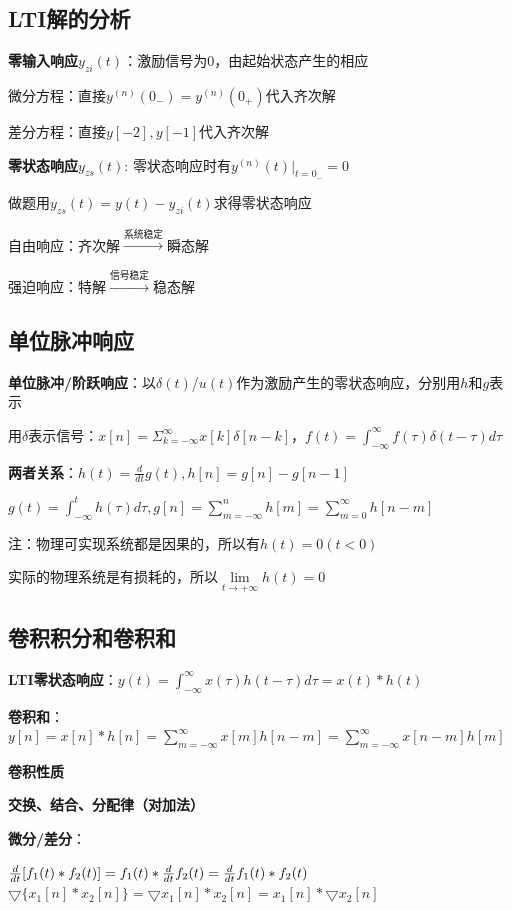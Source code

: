 \subsection*{LTI解的分析}

\textbf{零输入响应}$y_{zi}(t)$：激励信号为0，由起始状态产生的相应

微分方程：直接$y^{(n)}(0_-)=y^{(n)}(0_+)$代入齐次解

差分方程：直接$y[-2],y[-1]$代入齐次解

\textbf{零状态响应$y_{zs}(t)$}: 零状态响应时有$y^{(n)}(t)|_{t=0_-}=0$

做题用$y_{zs}(t)=y(t)-y_{zi}(t)$求得零状态响应

自由响应：齐次解$\xrightarrow{\text{系统稳定}}$瞬态解

强迫响应：特解$\xrightarrow{\text{信号稳定}}$稳态解

\subsection*{单位脉冲响应}

\textbf{单位脉冲/阶跃响应}：以$\delta(t)$/$u(t)$作为激励产生的零状态响应，分别用$h$和$g$表示

用$\delta$表示信号：$x[n]=\Sigma_{k=-\infty}^{\infty}x[k]\delta[n-k]$，$f(t)=\int_{-\infty}^{\infty}f(\tau)\delta(t-\tau)d\tau$

\textbf{两者关系}：$h(t)=\frac{d}{dt}g(t), h[n]=g[n]-g[n-1]$

$g(t)=\int_{-\infty}^{t}h(\tau)d\tau, g[n]=\sum_{m=-\infty}^{n}h[m]=\sum_{m=0}^{\infty}h[n-m]$

注：物理可实现系统都是因果的，所以有$h(t)=0(t<0)$

实际的物理系统是有损耗的，所以$\lim \limits_{t\to+\infty}h(t)=0$

\subsection*{卷积积分和卷积和}

\textbf{LTI零状态响应}：$y(t)=\int^\infty_{-\infty}x(\tau)h(t-\tau)d\tau=x(t)*h(t)$

\textbf{卷积和}：$y[n]=x[n]*h[n]=\sum^\infty_{m=-\infty}x[m]h[n-m]=\sum^\infty_{m=-\infty}x[n-m]h[m]$


\textbf{卷积性质}

\textbf{交换、结合、分配律（对加法）}

\textbf{微分/差分}：
  
  ${d\over dt}[f_1(t)*f_2(t)]=f_1(t)*{d\over dt}f_2(t)={d\over dt}f_1(t)*f_2(t) $  $\bigtriangledown\{x_1[n]*x_2[n]\}=\bigtriangledown x_1[n]*x_2[n]=x_1[n]*\bigtriangledown x_2[n] $

